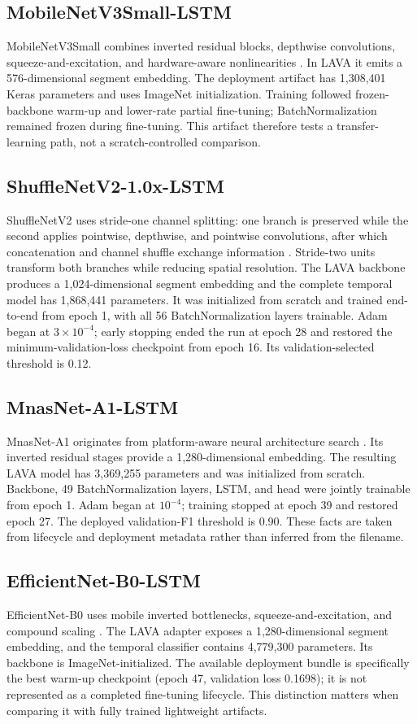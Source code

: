 \documentclass[10pt,journal,onecolumn]{IEEEtran}
\begin{document}
\subsection{MobileNetV3Small-LSTM}
MobileNetV3Small combines inverted residual blocks, depthwise convolutions, squeeze-and-excitation, and hardware-aware nonlinearities \cite{howard2019mobilenetv3,sandler2018mobilenetv2}. In LAVA it emits a 576-dimensional segment embedding. The deployment artifact has 1,308,401 Keras parameters and uses ImageNet initialization. Training followed frozen-backbone warm-up and lower-rate partial fine-tuning; BatchNormalization remained frozen during fine-tuning. This artifact therefore tests a transfer-learning path, not a scratch-controlled comparison.

\subsection{ShuffleNetV2-1.0x-LSTM}
ShuffleNetV2 uses stride-one channel splitting: one branch is preserved while the second applies pointwise, depthwise, and pointwise convolutions, after which concatenation and channel shuffle exchange information \cite{zhang2018shufflenet,ma2018shufflenetv2}. Stride-two units transform both branches while reducing spatial resolution. The LAVA backbone produces a 1,024-dimensional segment embedding and the complete temporal model has 1,868,441 parameters. It was initialized from scratch and trained end-to-end from epoch 1, with all 56 BatchNormalization layers trainable. Adam began at $3\times10^{-4}$; early stopping ended the run at epoch 28 and restored the minimum-validation-loss checkpoint from epoch 16. Its validation-selected threshold is 0.12.

\subsection{MnasNet-A1-LSTM}
MnasNet-A1 originates from platform-aware neural architecture search \cite{tan2019mnasnet}. Its inverted residual stages provide a 1,280-dimensional embedding. The resulting LAVA model has 3,369,255 parameters and was initialized from scratch. Backbone, 49 BatchNormalization layers, LSTM, and head were jointly trainable from epoch 1. Adam began at $10^{-4}$; training stopped at epoch 39 and restored epoch 27. The deployed validation-F1 threshold is 0.90. These facts are taken from lifecycle and deployment metadata rather than inferred from the filename.

\subsection{EfficientNet-B0-LSTM}
EfficientNet-B0 uses mobile inverted bottlenecks, squeeze-and-excitation, and compound scaling \cite{tan2019efficientnet}. The LAVA adapter exposes a 1,280-dimensional segment embedding, and the temporal classifier contains 4,779,300 parameters. Its backbone is ImageNet-initialized. The available deployment bundle is specifically the best warm-up checkpoint (epoch 47, validation loss 0.1698); it is not represented as a completed fine-tuning lifecycle. This distinction matters when comparing it with fully trained lightweight artifacts.
\end{document}
